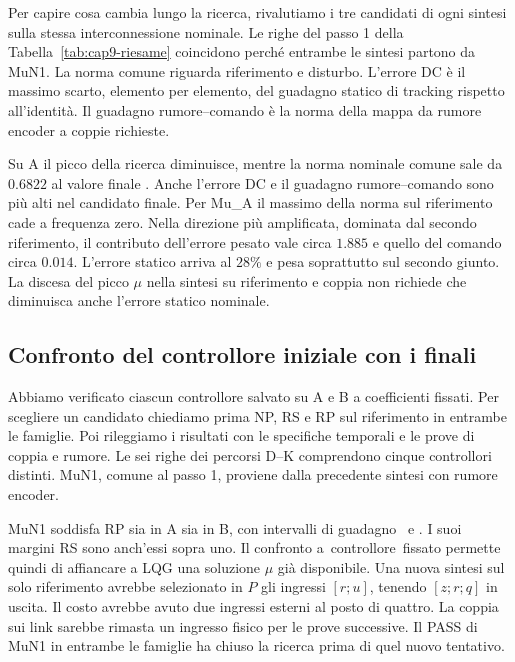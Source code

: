 Per capire cosa cambia lungo la ricerca, rivalutiamo i tre
candidati di ogni sintesi sulla stessa interconnessione nominale.
Le righe del passo 1 della Tabella~\ref{tab:cap9-riesame} coincidono
perché entrambe le sintesi partono da MuN1. La norma comune riguarda riferimento e
disturbo. L'errore DC è il massimo scarto, elemento per
elemento, del guadagno statico di tracking rispetto all'identità.
Il guadagno rumore--comando è la norma della mappa da rumore
encoder a coppie richieste.



Su A il picco della ricerca diminuisce, mentre la norma nominale
comune sale da $0.6822$ al valore finale \FinMuANorma. Anche
l'errore DC e il guadagno rumore--comando sono più alti nel
candidato finale. Per Mu\_A il massimo della norma sul riferimento
cade a frequenza zero. Nella direzione più amplificata, dominata
dal secondo riferimento, il contributo dell'errore pesato vale
circa $1.885$ e quello del comando circa $0.014$. L'errore
statico arriva al $28\%$ e pesa soprattutto sul secondo giunto.
La discesa del picco $\mu$ nella sintesi su riferimento e coppia
non richiede che diminuisca anche l'errore statico nominale.

\subsection{Confronto del controllore iniziale con i finali}

Abbiamo verificato ciascun controllore salvato su A e B a
coefficienti fissati. Per scegliere un candidato chiediamo
prima NP, RS e RP sul riferimento in entrambe le famiglie.
Poi rileggiamo i risultati con le specifiche temporali e le
prove di coppia e rumore. Le sei righe dei percorsi D--K
comprendono cinque controllori distinti. MuN1, comune al passo
1, proviene dalla precedente sintesi con rumore encoder.



MuN1 soddisfa RP sia in A sia in B, con intervalli di guadagno
\FinMuNOneRPA\ e \FinMuNOneRPB. I suoi margini RS sono anch'essi
sopra uno. Il confronto \hbox{a controllore fissato} permette quindi
di affiancare a LQG una soluzione $\mu$ già disponibile.
Una nuova sintesi sul solo riferimento avrebbe selezionato
in $P$ gli ingressi $[r;u]$, tenendo $[z;r;q]$ in uscita.
Il costo avrebbe avuto due ingressi esterni al posto di quattro.
La coppia sui link sarebbe rimasta un ingresso fisico per le
prove successive. Il PASS di MuN1 in entrambe le famiglie ha
chiuso la ricerca prima di quel nuovo tentativo.

